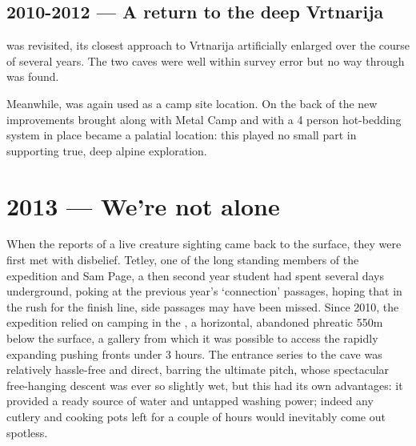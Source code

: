 \subsection{2010-2012 --- A return to the deep Vrtnarija} 
 was revisited, its closest approach to Vrtnarija artificially enlarged over the course of several years. The two caves were well within survey error but no way through was found. 

Meanwhile,  was again used as a camp site location. On the back of the new improvements brought along with Metal Camp and with a 4 person hot-bedding system in place  became a palatial location: this played no small part in supporting true, deep alpine exploration.



\section{2013 --- We’re not alone}

When the reports of a live creature sighting came back to the surface, they were first met with disbelief. Tetley, one of the long standing members of the expedition and Sam Page, a then second year student had spent several days underground, poking at the previous year’s ‘connection’ passages, hoping that in the rush for the finish line, side passages may have been missed. Since 2010, the expedition relied on camping in the , a horizontal, abandoned phreatic 550m below the surface, a gallery from which it was possible to access the rapidly expanding pushing fronts under 3 hours. The entrance series to the cave was relatively hassle-free and direct, barring the ultimate pitch, whose spectacular free-hanging descent was ever so slightly wet, but this had its own advantages: it provided a ready source of water and untapped washing power; indeed any cutlery and cooking pots left for a couple of hours would inevitably come out spotless.

